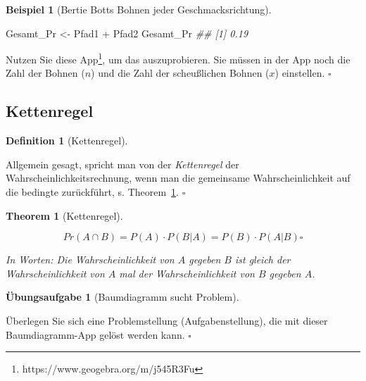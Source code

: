 \documentclass[
  ngerman,
  letterpaper,
  twoside,
  open=any]{scrbook}
\newenvironment{Shaded}{\begin{snugshade}}{\end{snugshade}}
\newcommand{\DocumentationTok}[1]{\textcolor[rgb]{0.37,0.37,0.37}{\textit{#1}}}
\newcommand{\NormalTok}[1]{\textcolor[rgb]{0.00,0.23,0.31}{#1}}
\newcommand{\OtherTok}[1]{\textcolor[rgb]{0.00,0.23,0.31}{#1}}
\newcommand{\SpecialCharTok}[1]{\textcolor[rgb]{0.37,0.37,0.37}{#1}}
\theoremstyle{definition}
\newtheorem{example}{Beispiel}[chapter]
\theoremstyle{plain}
\newtheorem{theorem}{Theorem}[chapter]
\theoremstyle{definition}
\newtheorem{exercise}{Übungsaufgabe}[chapter]
\theoremstyle{definition}
\newtheorem{definition}{Definition}[chapter]
\theoremstyle{definition}
\newtheorem{example}{Beispiel}[chapter]
\theoremstyle{definition}
\newtheorem{exercise}{Übungsaufgabe}[chapter]
\theoremstyle{remark}
\begin{document}
\begin{example}[Bertie Botts Bohnen jeder
Geschmacksrichtung]
\begin{Shaded}
\begin{Highlighting}[]
\NormalTok{Gesamt\_Pr }\OtherTok{\textless{}{-}}\NormalTok{ Pfad1 }\SpecialCharTok{+}\NormalTok{ Pfad2 }
\NormalTok{Gesamt\_Pr}
\DocumentationTok{\#\# [1] 0.19}
\end{Highlighting}
\end{Shaded}

Nutzen Sie diese App\footnote{https://www.geogebra.org/m/j545R3Fu}, um
das auszuprobieren. Sie müssen in der App noch die Zahl der Bohnen
(\(n\)) und die Zahl der scheußlichen Bohnen (\(x\)) einstellen.
\(\square\)

\end{example}

\subsection{Kettenregel}\label{kettenregel}

\begin{definition}[Kettenregel]\protect\hypertarget{def-kettenregel}{}\label{def-kettenregel}

Allgemein gesagt, spricht man von der \emph{Kettenregel} der
Wahrscheinlichkeitsrechnung, wenn man die gemeinsame Wahrscheinlichkeit
auf die bedingte zurückführt, s. Theorem~\ref{thm-kette}. \(\square\)

\end{definition}

\begin{theorem}[Kettenregel]\protect\hypertarget{thm-kette}{}\label{thm-kette}

\[Pr(A\cap B) = P(A) \cdot P(B|A) = P(B) \cdot P(A|B) \square\]

In Worten: Die Wahrscheinlichkeit von \(A\) gegeben \(B\) ist gleich der
Wahrscheinlichkeit von \(A\) mal der Wahrscheinlichkeit von \(B\)
gegeben \(A\).

\end{theorem}

\begin{exercise}[Baumdiagramm sucht
Problem]\protect\hypertarget{exr-baum3}{}\label{exr-baum3}

Überlegen Sie sich eine Problemstellung (Aufgabenstellung), die mit
dieser Baumdiagramm-App gelöst werden kann. \(\square\)

\end{exercise}
\end{document}
